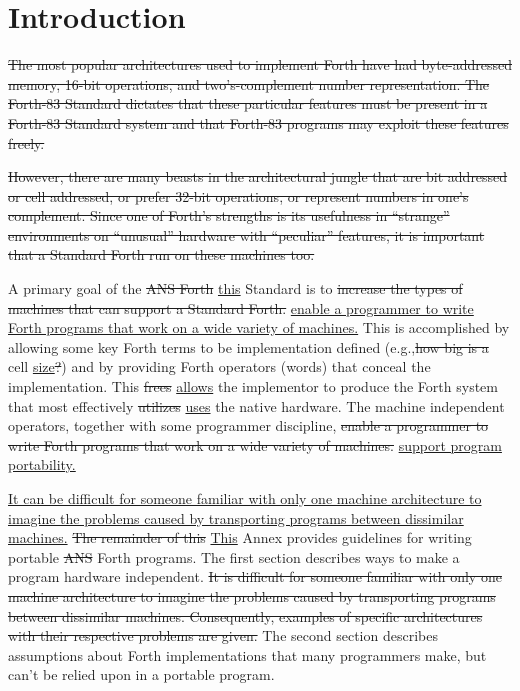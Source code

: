 \label{annex:port}

\section{Introduction} %
\cbstart{}

\sout{%
The most popular architectures used to implement Forth have had
byte-addressed memory, 16-bit op\-er\-a\-tions, and two's-complement
number representation. The Forth-83 Standard dictates that these
particular features must be present in a Forth-83 Standard system
and that Forth-83 programs may exploit these features freely.}

\sout{%
However, there are many beasts in the architectural jungle that are
bit addressed or cell addressed, or prefer 32-bit operations, or
represent numbers in one's complement. Since one of Forth's strengths
is its usefulness in ``strange'' environments on ``unusual'' hardware
with ``peculiar'' features, it is important that a Standard Forth run
on these machines too.}

A primary goal of the \sout{ANS Forth} \uline{this} Standard is to
\sout{increase the types of machines that can support a Standard Forth.}
\uline{enable a programmer to write Forth programs that work on
a wide variety of machines.}
This is accomplished by allowing some key Forth terms to be
implementation defined (e.g.,\sout{how big is a} cell \uline{size}\sout{?})
and by providing Forth operators (words) that conceal the
implementation. This \sout{frees} \uline{allows} the implementor to
produce the Forth system that most effectively \sout{utilizes} \uline{uses} the native
hardware. The machine independent operators, together with some
programmer discipline, \sout{enable a programmer to write Forth programs
that work on a wide variety of machines.} \uline{support program portability.}

\uline{It can be difficult for someone familiar with only one machine
architecture to imagine the problems caused by transporting programs
between dissimilar machines.}
\sout{The remainder of this} \uline{This} Annex provides guidelines for writing portable
\sout{ANS} Forth programs.
The first section describes ways to make a program hardware independent.
\sout{It is difficult for someone familiar with only one machine architecture to
imagine the problems caused by transporting programs between dissimilar
machines. Consequently, examples of specific architectures with their respective
problems are given.}
The second section describes assumptions about Forth implementations
that many programmers make, but can't be relied upon in a portable program.

